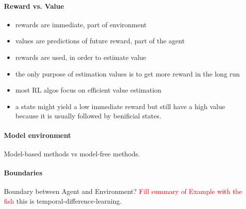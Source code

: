 \documentclass[10pt,a4paper]{article}
\begin{document}
\paragraph{Reward vs. Value}
\begin{itemize}
\item rewards are immediate, part of environment
\item values are predictions of future reward, part of the agent
\item rewards are used, in order to estimate value
\item the only purpose of estimation values is to get more reward in the long run
\item most RL algos focus on efficient value estimation
\item a state might yield a low immediate reward but still have a high value because it is usually followed by benificial states.
\end{itemize}

\paragraph{Model environment}
Model-based methods vs model-free methods.

\paragraph{Boundaries}
Boundary between Agent and Environment?  \textcolor{red}{Fill summary of Example with the fish} this is temporal-difference-learning.
\end{document}
